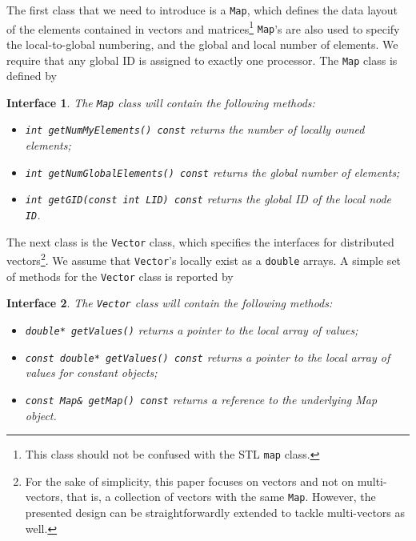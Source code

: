 \documentclass[acmtoms,acmnow]{acmtrans2m}
\newtheorem{interface}{Interface}[section]
\begin{document}
\smallskip

The first class that we need to introduce is a {\tt Map}, which defines the
data layout of the elements contained in vectors and matrices\footnote{This
class should not be confused with the STL {\tt map} class.} {\tt Map}'s
are also used to specify the local-to-global numbering, and the global and
local number of elements. We require that any global ID is assigned to exactly
one processor.  The {\tt Map} class is defined by
\begin{interface}
\label{int:map}
The {\tt Map} class will contain the following methods:

\begin{itemize}
\item {\tt int getNumMyElements() const} returns the number of locally owned elements;
\item {\tt int getNumGlobalElements() const} returns the global number of elements;
\item {\tt int getGID(const int LID) const} returns the global ID of the local node {\tt ID}.
\end{itemize}
\end{interface}

The next class is the {\tt Vector}
class, which specifies the interfaces for
distributed vectors\footnote{
For the sake of simplicity, this paper focuses on vectors and not on
multi-vectors, that is, a collection of vectors with the same {\tt Map}.
However, the presented design can be straightforwardly extended to tackle
multi-vectors as well.
}. We assume that {\tt Vector}'s  locally exist as a {\tt double} arrays.
A simple set of methods for the {\tt Vector} class is reported by
\begin{interface}
\label{int:vector}
The {\tt Vector} class will contain the following methods:

\begin{itemize}
\item {\tt double* getValues()} returns a pointer to the local array of values;
\item {\tt const double* getValues() const} returns a pointer to the local
array of values for constant objects;
\item {\tt const Map\& getMap() const} returns a reference to the underlying Map object.
\end{itemize}
\end{interface}
\end{document}
